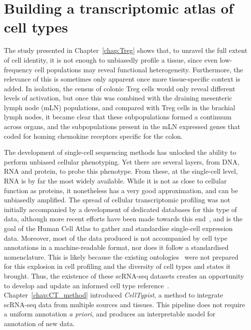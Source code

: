 \section{Building a transcriptomic atlas of cell types}
\label{section_atlas}
The study presented in Chapter~\ref{chap:Treg} shows that, to unravel the full extent of cell identity, it is not enough to unbiasedly profile a tissue, since even low-frequency cell populations may reveal functional heterogeneity. Furthermore, the relevance of this is sometimes only apparent once more tissue-specific context is added. In isolation, the census of colonic Treg cells would only reveal different levels of activation, but once this was combined with the draining mesenteric lymph node (mLN) populations, and compared with Treg cells in the brachial lymph nodes, it became clear that these subpopulations formed a continuum across organs, and the subpopulations present in the mLN expressed genes that coded for homing chemokine receptors specific for the colon.

The development of single-cell sequencing methods has unlocked the ability to perform unbiased cellular phenotyping. Yet there are several layers, from DNA, RNA and protein, to probe this phenotype. From these, at the single-cell level, RNA is by far the most widely available. While it is not as close to cellular function as proteins, it nonetheless has a very good approximation, and can be unbiasedly amplified. The spread of cellular transcriptomic profiling was not initially accompanied by a development of dedicated databases for this type of data, although more recent efforts have been made towards this end~\citep{alavi_web_2018,franzen_panglaodb:_2019}, and is the goal of the Human Cell Atlas to gather and standardise single-cell expression data. Moreover, most of the data produced is not accompanied by cell type annotations in a machine-readable format, nor does it follow a standardised nomenclature. This is likely because the existing ontologies~\citep{bard_ontology_2005} were not prepared for this explosion in cell profiling and the diversity of cell types and states it brought. Thus, the existence of these scRNA-seq datasets creates an opportunity to develop and update an informed cell type reference~\citep{aevermann_cell_2018}. Chapter~\ref{chap:CT_method} introduced \textit{CellTypist}, a method to integrate scRNA-seq data from multiple sources and tissues. This pipeline does not require a uniform annotation \textit{a priori}, and produces an interpretable model for annotation of new data.

